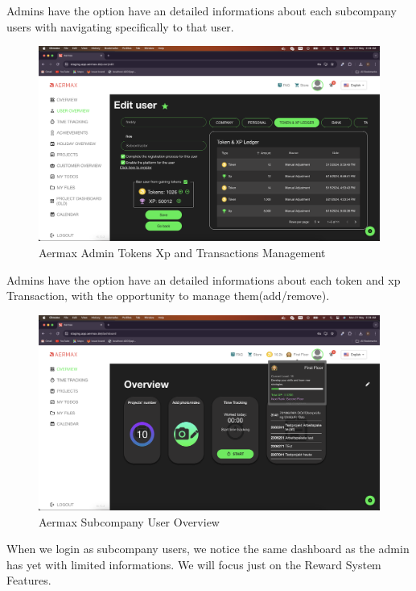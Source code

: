 Admins have the option have an detailed informations about each subcompany users with navigating specifically to that user.


\begin{figure}[H]
  \centering
  \includegraphics[width=1\textwidth]{src/assets/chapters/adminmenageranktoken.png}
  \caption{Aermax Admin Tokens Xp and Transactions Management}
  \label{fig:admin-users-tokens}
\end{figure}

Admins have the option have an detailed informations about each token and xp Transaction, with the opportunity to manage them(add/remove).


\begin{figure}[H]
  \centering
  \includegraphics[width=1\textwidth]{src/assets/chapters/subcompanyoverview.png}
  \caption{Aermax Subcompany User Overview}
  \label{fig:sub-login}
\end{figure}

When we login as subcompany users, we notice the same dashboard as the admin has yet with limited informations.
We will focus just on the Reward System Features.


